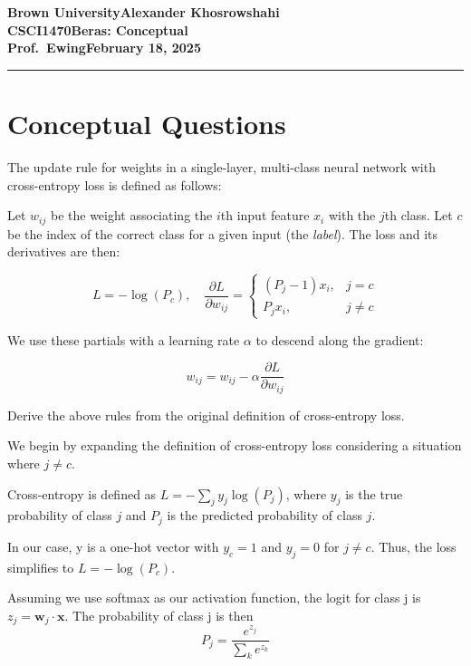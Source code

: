 \documentclass[11pt, answers]{exam}
\newcommand{\myname}{Alexander Khosrowshahi}
\newcommand{\assignment}{Beras: Conceptual}
\newcommand{\duedate}{February 18, 2025}
\begin{document}
\textbf{Brown University}\hfill\textbf{\myname}\\[0.01in]
\textbf{CSCI1470}\hfill\textbf{\assignment}\\[0.01in]
\textbf{Prof.\ Ewing}\hfill\textbf{\duedate}\\
\smallskip\hrule\bigskip

\section{Conceptual Questions}

\begin{questions}

	\question The update rule for weights in a single-layer, multi-class neural network with cross-entropy loss is defined as follows:

	Let \( w_{ij} \) be the weight associating the \( i \)th input feature \( x_i \) with the \( j \)th class. Let \( c \) be the index of the correct class for a given input (the \textit{label}). The loss and its derivatives are then:

	\[
		L = -\log(P_c), \quad \frac{\partial L}{\partial w_{ij}} =
		\begin{cases}
			(P_j - 1)x_i, & j = c    \\
			P_j x_i,      & j \neq c
		\end{cases}
	\]

	We use these partials with a learning rate \( \alpha \) to descend along the gradient:

	\[
		w_{ij} = w_{ij} - \alpha \frac{\partial L}{\partial w_{ij}}
	\]

	Derive the above rules from the original definition of cross-entropy loss.

	\begin{solution}
		We begin by expanding the definition of cross-entropy loss considering a situation where \(j \neq c\).

		Cross-entropy is defined as \( L = -\sum_{j} y_j \log(P_j) \), where \( y_j \) is the true probability of class \( j \) and \( P_j \) is the predicted probability of class \( j \).

		In our case, y is a one-hot vector with \( y_c = 1 \) and \( y_j = 0 \) for \( j \neq c \). Thus, the loss simplifies to \( L = -\log(P_c) \).

		Assuming we use softmax as our activation function, the logit for class j is \( z_j = \mathbf{w}_j \cdot \mathbf{x} \). The probability of class j is then
		\[ P_j = \frac{e^{z_j}}{\sum_{k} e^{z_k}} \]


\end{solution}
\end{questions}
\end{document}
